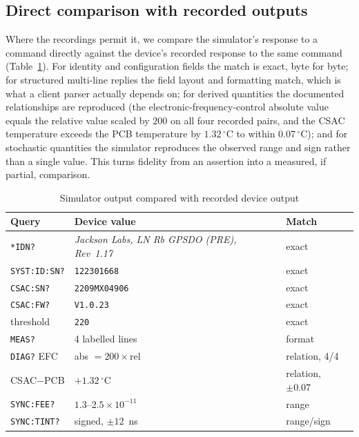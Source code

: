 \documentclass[conference]{IEEEtran}
\begin{document}
\subsection{Direct comparison with recorded outputs}
Where the recordings permit it, we compare the simulator's response to a
command directly against the device's recorded response to the same
command (Table~\ref{tab:fidelity}). For identity and configuration
fields the match is exact, byte for byte; for structured multi-line
replies the field layout and formatting match, which is what a client
parser actually depends on; for derived quantities the documented
relationships are reproduced (the electronic-frequency-control absolute
value equals the relative value scaled by $200$ on all four recorded
pairs, and the CSAC temperature exceeds the PCB temperature by
$1.32\,^\circ$C to within $0.07\,^\circ$C); and for stochastic
quantities the simulator reproduces the observed range and sign rather
than a single value. This turns fidelity from an assertion into a
measured, if partial, comparison.

\begin{table}[t]
\caption{Simulator output compared with recorded device output}
\label{tab:fidelity}
\centering
\footnotesize
\renewcommand{\arraystretch}{1.2}
\begin{tabular}{@{}p{}p{}p{}@{}}
\toprule
\textbf{Query} & \textbf{Device value} & \textbf{Match} \\
\midrule
\texttt{*IDN?} & \emph{Jackson Labs, LN Rb GPSDO (PRE), Rev~1.17} & exact \\
\texttt{SYST:ID:SN?} & \texttt{122301668} & exact \\
\texttt{CSAC:SN?} & \texttt{2209MX04906} & exact \\
\texttt{CSAC:FW?} & \texttt{V1.0.23} & exact \\
threshold & \texttt{220} & exact \\
\texttt{MEAS?} & 4 labelled lines & format \\
\texttt{DIAG?} EFC & abs $=200\times$rel & relation, 4/4 \\
CSAC$-$PCB & $+1.32\,^\circ$C & relation, $\pm0.07$ \\
\texttt{SYNC:FEE?} & $1.3$--$2.5\times10^{-11}$ & range \\
\texttt{SYNC:TINT?} & signed, $\pm12$~ns & range/sign \\
\bottomrule
\end{tabular}
\end{table}
\end{document}
